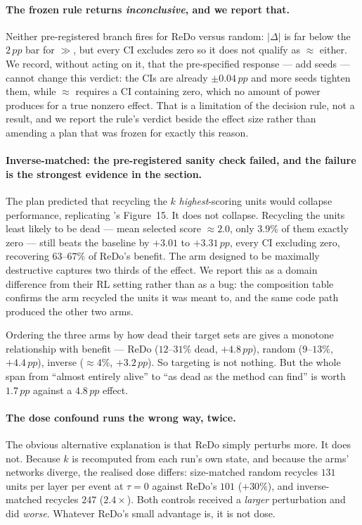 \documentclass[10pt]{article}
\newcommand{\pp}{\,pp}
\begin{document}
\paragraph{The frozen rule returns \emph{inconclusive}, and we report that.}
Neither pre-registered branch fires for ReDo versus random: $|\Delta|$ is far
below the $2\pp$ bar for $\gg$, but every CI excludes zero so it does not
qualify as $\approx$ either. We record, without acting on it, that the
pre-specified response --- add seeds --- cannot change this verdict: the CIs are
already $\pm 0.04\pp$ and more seeds tighten them, while $\approx$ requires a CI
containing zero, which no amount of power produces for a true nonzero effect.
That is a limitation of the decision rule, not a result, and we report the
rule's verdict beside the effect size rather than amending a plan that was
frozen for exactly this reason.

\paragraph{Inverse-matched: the pre-registered sanity check failed, and the
failure is the strongest evidence in the section.}
The plan predicted that recycling the $k$ \emph{highest}-scoring units would
collapse performance, replicating \citeauthor{sokar2023dormant}'s Figure~15. It
does not collapse. Recycling the units least likely to be dead --- mean selected
score $\approx 2.0$, only $3.9\%$ of them exactly zero --- still beats the
baseline by $+3.01$ to $+3.31\pp$, every CI excluding zero, recovering
$63$--$67\%$ of ReDo's benefit. The arm designed to be maximally destructive
captures two thirds of the effect. We report this as a domain difference from
their RL setting rather than as a bug: the composition table confirms the arm
recycled the units it was meant to, and the same code path produced the other
two arms.

Ordering the three arms by how dead their target sets are gives a monotone
relationship with benefit --- ReDo ($12$--$31\%$ dead, $+4.8\pp$), random
($9$--$13\%$, $+4.4\pp$), inverse ($\approx 4\%$, $+3.2\pp$). So targeting is not
nothing. But the whole span from ``almost entirely alive'' to ``as dead as the
method can find'' is worth $1.7\pp$ against a $4.8\pp$ effect.

\paragraph{The dose confound runs the wrong way, twice.}
The obvious alternative explanation is that ReDo simply perturbs more. It does
not. Because $k$ is recomputed from each run's own state, and because the arms'
networks diverge, the realised dose differs: size-matched random recycles
$131$ units per layer per event at $\tau=0$ against ReDo's $101$ ($+30\%$), and
inverse-matched recycles $247$ ($2.4\times$). Both controls received a
\emph{larger} perturbation and did \emph{worse}. Whatever ReDo's small advantage
is, it is not dose.
\end{document}
